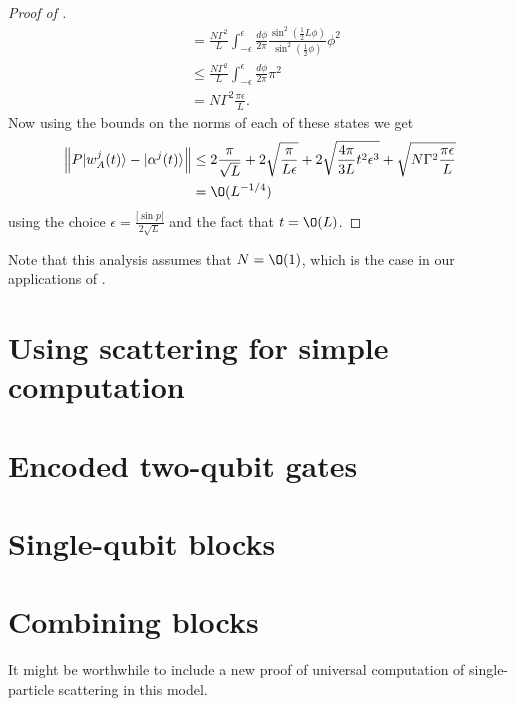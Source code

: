 \documentclass[../thesis-main/thesis-main]{subfiles}
\begin{document}
\begin{proof}[Proof of {}]
\begin{align*}
 & = \frac{N\Gamma^{2}}{L}\int_{-\epsilon}^{\epsilon}\frac{d\phi}{2\pi}\frac{\sin^{2}(\frac{1}{2}L\phi)}{\sin^{2}(\frac{1}{2}\phi)}\phi^{2}\\
 & \leq \frac{N\Gamma^{2}}{L}\int_{-\epsilon}^{\epsilon}\frac{d\phi}{2\pi}\pi^{2}\\
 & = N\Gamma^{2}\frac{\pi\epsilon}{L}.
\end{align*}
Now using the bounds on the norms of each of these states we get
\begin{align*}
\left\Vert P|w_{A}^{j}(t)\rangle-|\alpha^{j}(t)\rangle\right\Vert  & \leq 2\frac{\pi}{\sqrt{L}}+2\sqrt{\frac{\pi}{L\epsilon}}+2\sqrt{\frac{4\pi}{3L}t^{2}\epsilon^{3}}+\sqrt{N\Gamma^{2}\frac{\pi\epsilon}{L}}\\
 & = \O(L^{-{1}/{4}})
\end{align*}
using the choice $\epsilon=\frac{|{\sin p}|}{2\sqrt{L}}$ and the fact that $t = \O(L)$. 
\end{proof}

Note that this analysis assumes that $N = \O(1)$, which is the case in our applications of .

\section{Using scattering for simple computation}


\section{Encoded two-qubit gates}
\section{Single-qubit blocks}
\section{Combining blocks}

It might be worthwhile to include a new proof of universal computation of single-particle scattering in this model.
\end{document}
